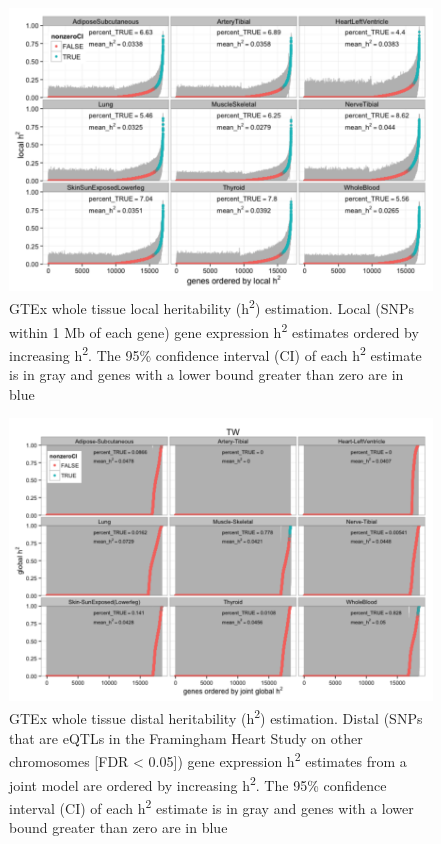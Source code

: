 \documentclass[]{article}
\begin{document}
\begin{figure}[htbp]
\centering
\includegraphics{GenArch_manuscript_files/figure-latex/TWlocalh2-1.pdf}
\caption{GTEx whole tissue local heritability (h\textsuperscript{2})
estimation. Local (SNPs within 1 Mb of each gene) gene expression
h\textsuperscript{2} estimates ordered by increasing
h\textsuperscript{2}. The 95\% confidence interval (CI) of each
h\textsuperscript{2} estimate is in gray and genes with a lower bound
greater than zero are in blue}
\end{figure}

\begin{figure}[htbp]
\centering
\includegraphics{GenArch_manuscript_files/figure-latex/TWglojth2-1.pdf}
\caption{GTEx whole tissue distal heritability (h\textsuperscript{2})
estimation. Distal (SNPs that are eQTLs in the Framingham Heart Study on
other chromosomes {[}FDR \textless{} 0.05{]}) gene expression
h\textsuperscript{2} estimates from a joint model are ordered by
increasing h\textsuperscript{2}. The 95\% confidence interval (CI) of
each h\textsuperscript{2} estimate is in gray and genes with a lower
bound greater than zero are in blue}
\end{figure}
\end{document}
